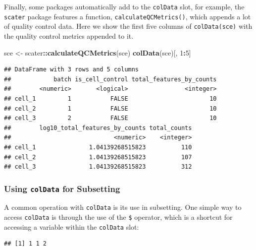 \documentclass[]{book}
\newenvironment{Shaded}{\begin{snugshade}}{\end{snugshade}}
\newcommand{\DecValTok}[1]{\textcolor[rgb]{0.00,0.00,0.81}{#1}}
\newcommand{\KeywordTok}[1]{\textcolor[rgb]{0.13,0.29,0.53}{\textbf{#1}}}
\newcommand{\NormalTok}[1]{#1}
\newcommand{\OperatorTok}[1]{\textcolor[rgb]{0.81,0.36,0.00}{\textbf{#1}}}
\newcommand{\StringTok}[1]{\textcolor[rgb]{0.31,0.60,0.02}{#1}}
\begin{document}
Finally, some packages automatically add to the \texttt{colData} slot, for example, the \texttt{scater} package features a function, \texttt{calculateQCMetrics()}, which appends a lot of quality control data. Here we show the first five columns of \texttt{colData(sce)} with the quality control metrics appended to it.

\begin{Shaded}
\begin{Highlighting}[]
\NormalTok{sce <-}\StringTok{ }\NormalTok{scater}\OperatorTok{::}\KeywordTok{calculateQCMetrics}\NormalTok{(sce)}
\KeywordTok{colData}\NormalTok{(sce)[, }\DecValTok{1}\OperatorTok{:}\DecValTok{5}\NormalTok{]}
\end{Highlighting}
\end{Shaded}

\begin{verbatim}
## DataFrame with 3 rows and 5 columns
##            batch is_cell_control total_features_by_counts
##        <numeric>       <logical>                <integer>
## cell_1         1           FALSE                       10
## cell_2         1           FALSE                       10
## cell_3         2           FALSE                       10
##        log10_total_features_by_counts total_counts
##                             <numeric>    <integer>
## cell_1               1.04139268515823          110
## cell_2               1.04139268515823          107
## cell_3               1.04139268515823          312
\end{verbatim}

\hypertarget{using-coldata-for-subsetting}{%
\subsubsection{\texorpdfstring{Using \texttt{colData} for Subsetting}{Using colData for Subsetting}}\label{using-coldata-for-subsetting}}

A common operation with \texttt{colData} is its use in subsetting. One simple way to access \texttt{colData} is through the use of the \texttt{\$} operator, which is a shortcut for accessing a variable within the \texttt{colData} slot:

\begin{Shaded}
\end{Shaded}

\begin{verbatim}
## [1] 1 1 2
\end{verbatim}
\end{document}
